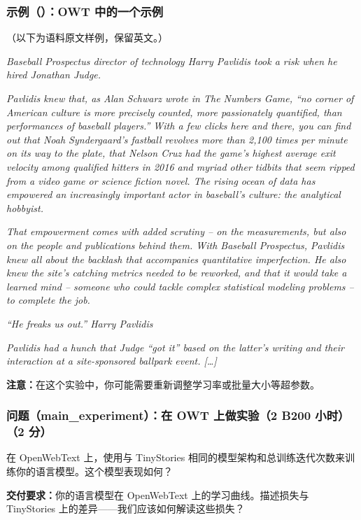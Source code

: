 \subsubsection*{示例（）：OWT 中的一个示例}

（以下为语料原文样例，保留英文。）

\textit{Baseball Prospectus director of technology Harry Pavlidis took a risk when he hired Jonathan Judge.}

\textit{Pavlidis knew that, as Alan Schwarz wrote in The Numbers Game, ``no corner of American culture is more precisely counted, more passionately quantified, than performances of baseball players.'' With a few clicks here and there, you can find out that Noah Syndergaard's fastball revolves more than 2,100 times per minute on its way to the plate, that Nelson Cruz had the game's highest average exit velocity among qualified hitters in 2016 and myriad other tidbits that seem ripped from a video game or science fiction novel. The rising ocean of data has empowered an increasingly important actor in baseball's culture: the analytical hobbyist.}

\textit{That empowerment comes with added scrutiny -- on the measurements, but also on the people and publications behind them. With Baseball Prospectus, Pavlidis knew all about the backlash that accompanies quantitative imperfection. He also knew the site's catching metrics needed to be reworked, and that it would take a learned mind -- someone who could tackle complex statistical modeling problems -- to complete the job.}

\textit{``He freaks us out.'' Harry Pavlidis}

\textit{Pavlidis had a hunch that Judge ``got it'' based on the latter's writing and their interaction at a site-sponsored ballpark event. [\ldots]}

\textbf{注意：}在这个实验中，你可能需要重新调整学习率或批量大小等超参数。

\subsubsection*{问题（main\_experiment）：在 OWT 上做实验（2 B200 小时）（2 分）}

在 OpenWebText 上，使用与 TinyStories 相同的模型架构和总训练迭代次数来训练你的语言模型。这个模型表现如何？

\textbf{交付要求：}你的语言模型在 OpenWebText 上的学习曲线。描述损失与 TinyStories 上的差异——我们应该如何解读这些损失？

